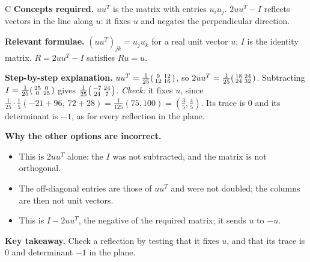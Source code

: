 \documentclass[11pt,a4paper]{article}
\newcommand{\qsep}{\par\vspace{2pt}{\color{black!15}\hrule}\vspace{4pt}}
\begin{document}
\begin{solbox}{C}
\textbf{\color{brand}Concepts required.} $uu^{T}$ is the matrix with entries $u_iu_j$. $2uu^{T} - I$ reflects vectors in the line along $u$: it fixes $u$ and negates the perpendicular direction.

\textbf{\color{brand}Relevant formulae.} $(uu^{T})_{jk} = u_ju_k$ for a real unit vector $u$; $I$ is the identity matrix. $R = 2uu^{T} - I$ satisfies $Ru = u$.

\textbf{\color{brand}Step-by-step explanation.} $uu^{T} = \frac{1}{25}\begin{psmallmatrix}9 & 12\\ 12 & 16\end{psmallmatrix}$, so
$2uu^{T} = \frac{1}{25}\begin{psmallmatrix}18 & 24\\ 24 & 32\end{psmallmatrix}$. Subtracting $I = \frac{1}{25}\begin{psmallmatrix}25 & 0\\ 0 & 25\end{psmallmatrix}$ gives
$\frac{1}{25}\begin{psmallmatrix}-7 & 24\\ 24 & 7\end{psmallmatrix}$.
\emph{Check:} it fixes $u$, since $\frac{1}{25}\cdot\frac15(-21 + 96,\ 72 + 28) = \frac{1}{125}(75, 100) = (\frac35, \frac45)$. Its trace is $0$ and its
determinant is $-1$, as for every reflection in the plane.

\textbf{\color{brand}Why the other options are incorrect.}
\begin{itemize}[leftmargin=2.4em, itemsep=1pt, topsep=2pt]
\item[\textbf{(A)}] This is $2uu^{T}$ alone: the $I$ was not subtracted, and the matrix is not orthogonal.
\item[\textbf{(B)}] The off-diagonal entries are those of $uu^{T}$ and were not doubled; the columns are then not unit vectors.
\item[\textbf{(D)}] This is $I - 2uu^{T}$, the negative of the required matrix; it sends $u$ to $-u$.
\end{itemize}
\textbf{\color{brand}Key takeaway.} Check a reflection by testing that it fixes $u$, and that its trace is $0$ and determinant $-1$ in the plane.
\end{solbox}
\qsep
\end{document}
